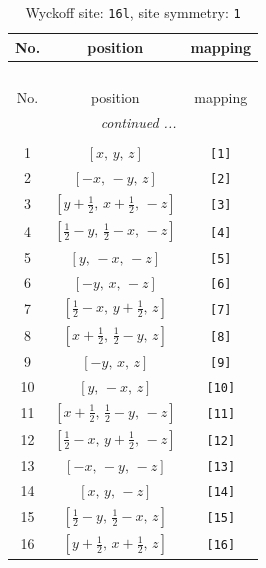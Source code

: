 \documentclass[fleqn,8pt]{jsarticle}
\begin{document}
\begin{longtable}{ccc}
\caption{Wyckoff site: {\tt 16l}, site symmetry: {\tt 1}}
 \\
 \hline \hline
No. & position & mapping \\ \hline \endfirsthead

\multicolumn{2}{l}{\tablename\ \thetable{}} \\
 \hline \hline
No. & position & mapping \\ \hline \endhead

 \hline \hline
\multicolumn{2}{r}{\footnotesize\it continued ...} \\ \endfoot

 \hline \hline
\multicolumn{2}{r}{} \\ \endlastfoot

1 & $\left[ x,\, y,\, z \right]$ & {\tt [1]} \\ \hline
2 & $\left[ - x,\, - y,\, z \right]$ & {\tt [2]} \\ \hline
3 & $\left[ y + \frac{1}{2},\, x + \frac{1}{2},\, - z \right]$ & {\tt [3]} \\ \hline
4 & $\left[ \frac{1}{2} - y,\, \frac{1}{2} - x,\, - z \right]$ & {\tt [4]} \\ \hline
5 & $\left[ y,\, - x,\, - z \right]$ & {\tt [5]} \\ \hline
6 & $\left[ - y,\, x,\, - z \right]$ & {\tt [6]} \\ \hline
7 & $\left[ \frac{1}{2} - x,\, y + \frac{1}{2},\, z \right]$ & {\tt [7]} \\ \hline
8 & $\left[ x + \frac{1}{2},\, \frac{1}{2} - y,\, z \right]$ & {\tt [8]} \\ \hline
9 & $\left[ - y,\, x,\, z \right]$ & {\tt [9]} \\ \hline
10 & $\left[ y,\, - x,\, z \right]$ & {\tt [10]} \\ \hline
11 & $\left[ x + \frac{1}{2},\, \frac{1}{2} - y,\, - z \right]$ & {\tt [11]} \\ \hline
12 & $\left[ \frac{1}{2} - x,\, y + \frac{1}{2},\, - z \right]$ & {\tt [12]} \\ \hline
13 & $\left[ - x,\, - y,\, - z \right]$ & {\tt [13]} \\ \hline
14 & $\left[ x,\, y,\, - z \right]$ & {\tt [14]} \\ \hline
15 & $\left[ \frac{1}{2} - y,\, \frac{1}{2} - x,\, z \right]$ & {\tt [15]} \\ \hline
16 & $\left[ y + \frac{1}{2},\, x + \frac{1}{2},\, z \right]$ & {\tt [16]} \\
\end{longtable}
\end{document}
